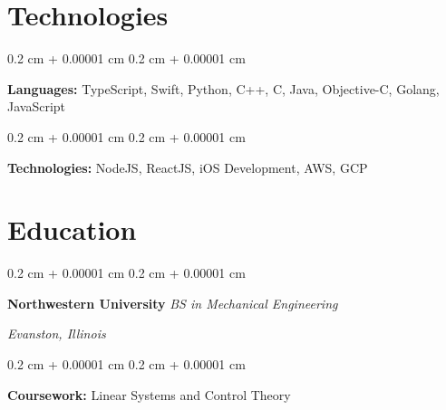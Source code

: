 \documentclass[12pt, letterpaper]{article}
\newenvironment{highlights}{
    \begin{itemize}[
        topsep=0.10 cm,
        parsep=0.10 cm,
        partopsep=0pt,
        itemsep=0pt,
        leftmargin=0.4 cm + 10pt
    ]
}{
    \end{itemize}
} %
\newenvironment{onecolentry}{
    \begin{adjustwidth}{
        0.2 cm + 0.00001 cm
    }{
        0.2 cm + 0.00001 cm
    }
}{
    \end{adjustwidth}
} %
\newenvironment{twocolentry}[2][]{
    \onecolentry
    \def\secondColumn{#2}
    \setcolumnwidth{\fill, 4.5 cm}
    \begin{paracol}{2}
}{
    \switchcolumn \raggedleft \secondColumn
    \end{paracol}
    \endonecolentry
} %
\begin{document}
    \section{Technologies}
        \begin{onecolentry}
            \textbf{Languages:} TypeScript, Swift, Python, C++, C, Java, Objective-C, Golang, JavaScript
        \end{onecolentry}

        \vspace{0.2 cm}

        \begin{onecolentry}
            \textbf{Technologies:} NodeJS, ReactJS, iOS Development, AWS, GCP
        \end{onecolentry}

    \section{Education}
        \begin{twocolentry}{
        \textit{Evanston, Illinois}}
            \textbf{Northwestern University}
            \textit{BS in Mechanical Engineering}
        \end{twocolentry}

        \vspace{0.10 cm}
        \begin{onecolentry}
                \textbf{Coursework:} Linear Systems and Control Theory
        \end{onecolentry}
\end{document}
